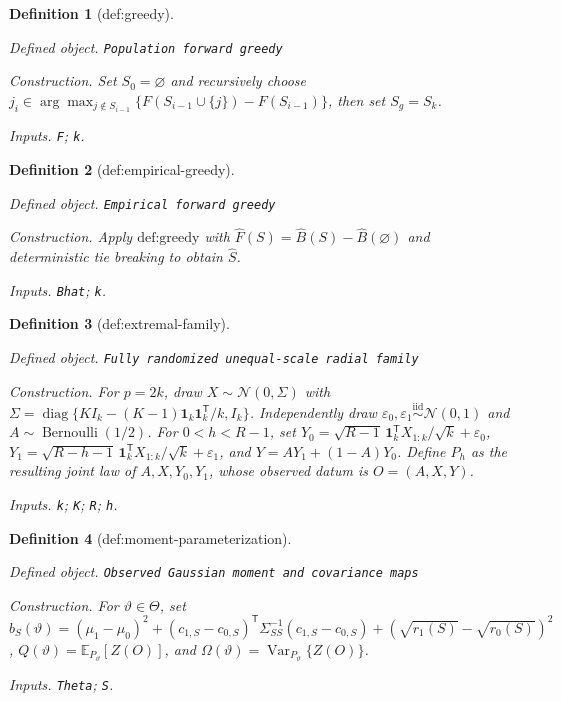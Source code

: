 \documentclass{article}
\newtheorem{definition}{Definition}
\begin{document}
\begin{definition}[def:greedy]\label{def:greedy}
\par\smallskip\noindent\emph{Defined object.} \texttt{Population forward greedy}
\par\smallskip\noindent\emph{Construction.} Set \(S_0=\varnothing\) and recursively choose \(j_i\in\arg\max_{j\notin S_{i-1}}\{F(S_{i-1}\cup\{j\})-F(S_{i-1})\}\), then set \(S_g=S_k\).
\par\smallskip\noindent\emph{Inputs.} \texttt{F}; \texttt{k}.
\end{definition}

\begin{definition}[def:empirical-greedy]\label{def:empirical-greedy}
\par\smallskip\noindent\emph{Defined object.} \texttt{Empirical forward greedy}
\par\smallskip\noindent\emph{Construction.} Apply \(\text{def:greedy}\) with \(\widehat F(S)=\widehat B(S)-\widehat B(\varnothing)\) and deterministic tie breaking to obtain \(\widehat S\).
\par\smallskip\noindent\emph{Inputs.} \texttt{Bhat}; \texttt{k}.
\end{definition}

\begin{definition}[def:extremal-family]\label{def:extremal-family}
\par\smallskip\noindent\emph{Defined object.} \texttt{Fully randomized unequal-\allowbreak{}scale radial family}
\par\smallskip\noindent\emph{Construction.} For \(p=2k\), draw \(X\sim\mathcal N(0,\Sigma)\) with \(\Sigma=\operatorname{diag}\{KI_k-(K-1)\mathbf 1_k\mathbf 1_k^{\mathsf T}/k,I_k\}\). Independently draw \(\varepsilon_0,\varepsilon_1\stackrel{\mathrm{iid}}{\sim}\mathcal N(0,1)\) and \(A\sim\operatorname{Bernoulli}(1/2)\). For \(0<h<R-1\), set \(Y_0=\sqrt{R-1}\,\mathbf 1_k^{\mathsf T}X_{1:k}/\sqrt{k}+\varepsilon_0\), \(Y_1=\sqrt{R-h-1}\,\mathbf 1_k^{\mathsf T}X_{1:k}/\sqrt{k}+\varepsilon_1\), and \(Y=AY_1+(1-A)Y_0\). Define \(P_h\) as the resulting joint law of \(A,X,Y_0,Y_1\), whose observed datum is \(O=(A,X,Y)\).
\par\smallskip\noindent\emph{Inputs.} \texttt{k}; \texttt{K}; \texttt{R}; \texttt{h}.
\end{definition}

\begin{definition}[def:moment-parameterization]\label{def:moment-parameterization}
\par\smallskip\noindent\emph{Defined object.} \texttt{Observed Gaussian moment and covariance maps}
\par\smallskip\noindent\emph{Construction.} For \(\vartheta\in\Theta\), set \(b_S(\vartheta)=(\mu_1-\mu_0)^2+(c_{1,S}-c_{0,S})^{\mathsf T}\Sigma_{SS}^{-1}(c_{1,S}-c_{0,S})+(\sqrt{r_1(S)}-\sqrt{r_0(S)})^2\), \(Q(\vartheta)=\mathbb E_{P_{\vartheta}}[Z(O)]\), and \(\Omega(\vartheta)=\operatorname{Var}_{P_{\vartheta}}\{Z(O)\}\).
\par\smallskip\noindent\emph{Inputs.} \texttt{Theta}; \texttt{S}.
\end{definition}
\end{document}
